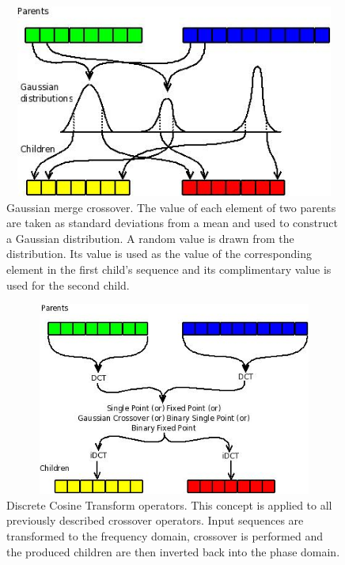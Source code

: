 \documentclass[12pt]{article}
\begin{document}
\begin{figure}[htb]
\begin{center}
\includegraphics[height=2.5in,width=4.5in]{images/gaussian_crossover.jpeg}
\caption{
    Gaussian merge crossover.  The value of each element of two parents are taken as standard deviations from a mean and used to construct a Gaussian distribution.  A random value is drawn from the distribution.  Its value is used as the value of the corresponding element in the first child's sequence and its complimentary value is used for the second child.
}
\end{center}
\end{figure}

\begin{figure}[htb]
\begin{center}
\includegraphics[height=2.5in,width=4.5in]{images/dct_crossover.jpeg}
\caption{
    Discrete Cosine Transform operators.  This concept is applied to all previously described crossover operators.  Input sequences are transformed to the frequency domain, crossover is performed and the produced children are then inverted back into the phase domain.
}
\end{center}
\end{figure}

\clearpage
\end{document}
